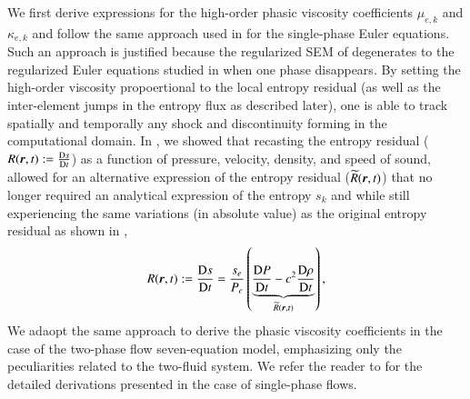 \documentclass[preprint,10pt]{elsarticle}
\begin{document}
We first derive expressions for the high-order phasic viscosity coefficients $\mu_{e,k}$ and $\kappa_{e,k}$ and follow the same 
approach used in \cite{DelchiniCompFluid2014-euler} for the single-phase Euler equations. Such an approach is justified because the regularized SEM of  
degenerates to the regularized Euler equations studied in \cite{DelchiniCompFluid2014-euler} when one phase disappears.
By setting the high-order viscosity propoertional to the local entropy residual (as well as the inter-element jumps in the entropy flux as described later),
one is able to track spatially and temporally any shock and discontinuity forming in the computational domain. 
In \cite{DelchiniCompFluid2014-euler}, we showed that recasting the entropy residual ($R(\boldsymbol r,t)  := \frac{\textrm{D} s}{\textrm{D} t}$) 
as a function of pressure, velocity, density, and speed of 
sound, allowed for an alternative expression of the entropy residual ($\widetilde{R}(\boldsymbol r,t)$)
that no longer required an analytical expression of the entropy $s_k$ and while still experiencing the same variations (in absolute value) 
as the original entropy residual as shown in ,
%
\begin{equation}\label{eq:ent-res-sem}
R(\boldsymbol r,t)  := \frac{\textrm{D} s}{\textrm{D} t} = \frac{s_e}{P_e} \left( \underbrace{\frac{\textrm{D} P}{\textrm{D} t} - c^2 \frac{\textrm{D} \rho}{\textrm{D} t} }_{\widetilde{R}(\boldsymbol r,t)} \right) ,
\end{equation} 
%
We adaopt the same approach to derive the phasic viscosity coefficients in the case of the two-phase flow seven-equation model, emphasizing only the 
peculiarities related to the two-fluid system. We refer the reader to \cite{DelchiniCompFluid2014-euler} for the detailed derivations presented in the case of
single-phase flows.
\end{document}
